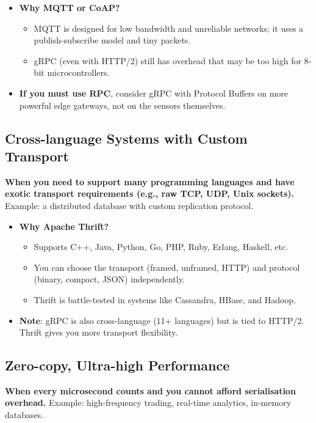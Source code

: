 \documentclass[10pt,a4paper]{article}
\begin{document}
\begin{itemize}
    \item \textbf{Why MQTT or CoAP?}
        \begin{itemize}
            \item MQTT is designed for low bandwidth and unreliable networks; it uses a publish-subscribe model and tiny packets.
            \item gRPC (even with HTTP/2) still has overhead that may be too high for 8-bit microcontrollers.
        \end{itemize}
    \item \textbf{If you must use RPC}, consider gRPC with Protocol Buffers on more powerful edge gateways, not on the sensors themselves.
\end{itemize}

\subsection{Cross-language Systems with Custom Transport}
\textbf{When you need to support many programming languages and have exotic transport requirements (e.g., raw TCP, UDP, Unix sockets).} Example: a distributed database with custom replication protocol.

\begin{itemize}
    \item \textbf{Why Apache Thrift?}
        \begin{itemize}
            \item Supports C++, Java, Python, Go, PHP, Ruby, Erlang, Haskell, etc.
            \item You can choose the transport (framed, unframed, HTTP) and protocol (binary, compact, JSON) independently.
            \item Thrift is battle-tested in systems like Cassandra, HBase, and Hadoop.
        \end{itemize}
    \item \textbf{Note}: gRPC is also cross-language (11+ languages) but is tied to HTTP/2. Thrift gives you more transport flexibility.
\end{itemize}

\subsection{Zero-copy, Ultra-high Performance}
\textbf{When every microsecond counts and you cannot afford serialisation overhead.} Example: high-frequency trading, real-time analytics, in-memory databases.
\end{document}
